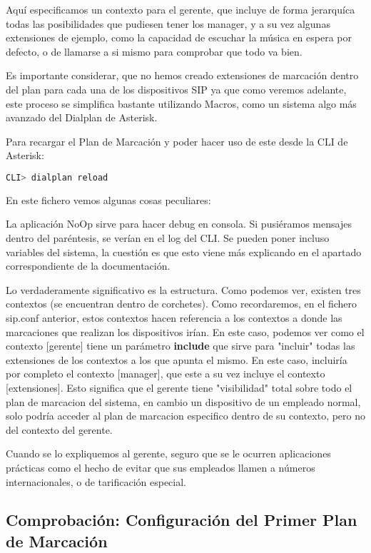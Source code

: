 Aquí especificamos un contexto para el gerente, que incluye de forma jerarquíca todas las posibilidades que pudiesen tener los manager, y a su vez algunas extensiones de ejemplo, como la capacidad de escuchar la música en espera por defecto, o de llamarse a si mismo para comprobar que todo va bien.

Es importante considerar, que no hemos creado extensiones de marcación dentro del plan para cada una de los dispositivos SIP ya que como veremos adelante, este proceso se simplifica bastante utilizando Macros, como un sistema algo más avanzado del Dialplan de Asterisk.

Para recargar el Plan de Marcación y poder hacer uso de este desde la CLI de Asterisk:

\begin{lstlisting}[language=sh]
CLI> dialplan reload
\end{lstlisting}

 En este fichero vemos algunas cosas peculiares:

La aplicación NoOp sirve para hacer debug en consola. Si pusiéramos mensajes dentro del paréntesis, se verían en el log del CLI. Se pueden poner incluso variables del sistema, la cuestión es que esto viene más explicando en el apartado correspondiente de la documentación.

Lo verdaderamente significativo es la estructura. Como podemos ver, existen tres contextos (se encuentran dentro de corchetes). Como recordaremos, en el fichero sip.conf anterior, estos contextos hacen referencia a los contextos a donde las marcaciones que realizan los dispositivos irían. En este caso, podemos ver como el contexto [gerente] tiene un parámetro \textbf{include} que sirve para "incluir" todas las extensiones de los contextos a los que apunta el mismo. En este caso, incluiría por completo el contexto [manager], que este a su vez incluye el contexto [extensiones]. Esto significa que el gerente tiene "visibilidad" total sobre todo el plan de marcacion del sistema, en cambio un dispositivo de un empleado normal, solo podría acceder al plan de marcacion especifico dentro de su contexto, pero no del contexto del gerente.

Cuando se lo expliquemos al gerente, seguro que se le ocurren aplicaciones prácticas como el hecho de evitar que sus empleados llamen a números internacionales, o de tarificación especial.

\subsection{Comprobación: Configuración del Primer Plan de Marcación}

